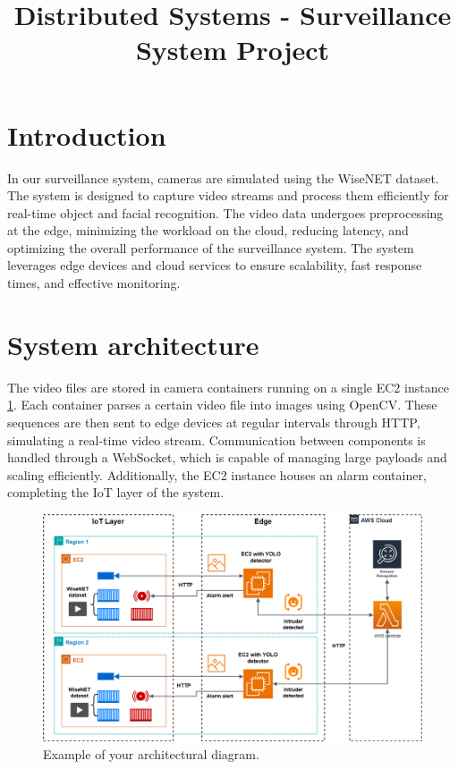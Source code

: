 \documentclass[conference]{IEEEtran}
\begin{document}
\title{Distributed Systems - Surveillance System Project}

\author{
\and
{}
\and
{}
}

\maketitle

\section{Introduction}
In our surveillance system, cameras are simulated using the WiseNET dataset. The system is designed to capture video streams and process them efficiently for real-time object and facial recognition. The video data undergoes preprocessing at the edge, minimizing the workload on the cloud, reducing latency, and optimizing the overall performance of the surveillance system. The system leverages edge devices and cloud services to ensure scalability, fast response times, and effective monitoring.  

\section{System architecture}
The video files are stored in camera containers running on a single EC2 instance \ref{fig:architecture}. Each container parses a certain video file into images using OpenCV. These sequences are then sent to edge devices at regular intervals through HTTP, simulating a real-time video stream. Communication between components is handled through a WebSocket, which is capable of managing large payloads and scaling efficiently. Additionally, the EC2 instance houses an alarm container, completing the IoT layer of the system.

\begin{figure}[h!]
    \centering
    \includegraphics[width=1\linewidth]{DS_architecture_version2.png}
    \caption{Example of your architectural diagram.}
    \label{fig:architecture}
\end{figure}
\end{document}

